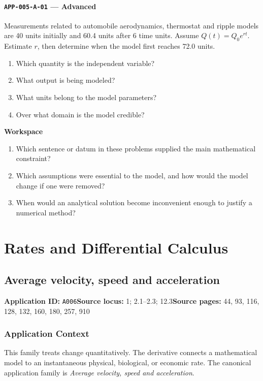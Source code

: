 \documentclass[11pt]{book}
\newcommand{\pid}[1]{\texttt{#1}}
\newcommand{\workspace}{\par\vspace{0.7in}\hrulefill\par\vspace{0.55in}\hrulefill\par}
\begin{document}
\subsection*{\pid{APP-005-A-01} — Advanced}
\begin{problembox}
Measurements related to automobile aerodynamics, thermostat and ripple models are 40 units initially and 60.4 units after 6 time units. Assume $Q(t)=Q_0e^{rt}$. Estimate $r$, then determine when the model first reaches 72.0 units.
\end{problembox}
\begin{promptbox}\begin{enumerate}
\item Which quantity is the independent variable?
\item What output is being modeled?
\item What units belong to the model parameters?
\item Over what domain is the model credible?
\end{enumerate}\end{promptbox}
\textbf{Workspace}\workspace
\begin{reflectionbox}\begin{enumerate}
\item Which sentence or datum in these problems supplied the main mathematical constraint?
\item Which assumptions were essential to the model, and how would the model change if one were removed?
\item When would an analytical solution become inconvenient enough to justify a numerical method?
\end{enumerate}\end{reflectionbox}
\part{Rates and Differential Calculus}
\chapter{Average velocity, speed and acceleration}\label{app:A006}
\textbf{Application ID:} \pid{A006}\quad \textbf{Source locus:} 1; 2.1–2.3; 12.3\quad \textbf{Source pages:} 44, 93, 116, 128, 132, 160, 180, 257, 910
\section*{Application Context}
This family treats change quantitatively. The derivative connects a mathematical model to an instantaneous physical, biological, or economic rate. The canonical application family is \emph{Average velocity, speed and acceleration}.
\end{document}
